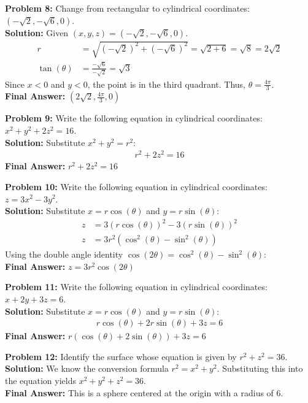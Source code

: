 \documentclass[12pt]{article}
\begin{document}
\textbf{Problem 8:} Change from rectangular to cylindrical coordinates: $(-\sqrt{2}, -\sqrt{6}, 0)$.
\\
\textbf{Solution:} Given $(x, y, z) = (-\sqrt{2}, -\sqrt{6}, 0)$.
\begin{align*}
r &= \sqrt{(-\sqrt{2})^2 + (-\sqrt{6})^2} = \sqrt{2 + 6} = \sqrt{8} = 2\sqrt{2} \\
\tan(\theta) &= \frac{-\sqrt{6}}{-\sqrt{2}} = \sqrt{3}
\end{align*}
Since $x < 0$ and $y < 0$, the point is in the third quadrant. Thus, $\theta = \frac{4\pi}{3}$.
\\
\textbf{Final Answer:} $(2\sqrt{2}, \frac{4\pi}{3}, 0)$
\vspace{0.5cm}

\textbf{Problem 9:} Write the following equation in cylindrical coordinates: $x^2 + y^2 + 2z^2 = 16$.
\\
\textbf{Solution:} Substitute $x^2 + y^2 = r^2$:
\begin{align*}
r^2 + 2z^2 = 16
\end{align*}
\textbf{Final Answer:} $r^2 + 2z^2 = 16$
\vspace{0.5cm}

\textbf{Problem 10:} Write the following equation in cylindrical coordinates: $z = 3x^2 - 3y^2$.
\\
\textbf{Solution:} Substitute $x = r\cos(\theta)$ and $y = r\sin(\theta)$:
\begin{align*}
z &= 3(r\cos(\theta))^2 - 3(r\sin(\theta))^2 \\
z &= 3r^2(\cos^2(\theta) - \sin^2(\theta))
\end{align*}
Using the double angle identity $\cos(2\theta) = \cos^2(\theta) - \sin^2(\theta)$:
\\
\textbf{Final Answer:} $z = 3r^2\cos(2\theta)$
\vspace{0.5cm}

\textbf{Problem 11:} Write the following equation in cylindrical coordinates: $x + 2y + 3z = 6$.
\\
\textbf{Solution:} Substitute $x = r\cos(\theta)$ and $y = r\sin(\theta)$:
\begin{align*}
r\cos(\theta) + 2r\sin(\theta) + 3z = 6
\end{align*}
\textbf{Final Answer:} $r(\cos(\theta) + 2\sin(\theta)) + 3z = 6$
\vspace{0.5cm}

\textbf{Problem 12:} Identify the surface whose equation is given by $r^2 + z^2 = 36$.
\\
\textbf{Solution:} We know the conversion formula $r^2 = x^2 + y^2$. Substituting this into the equation yields $x^2 + y^2 + z^2 = 36$.
\\
\textbf{Final Answer:} This is a sphere centered at the origin with a radius of $6$.
\vspace{0.5cm}
\end{document}
